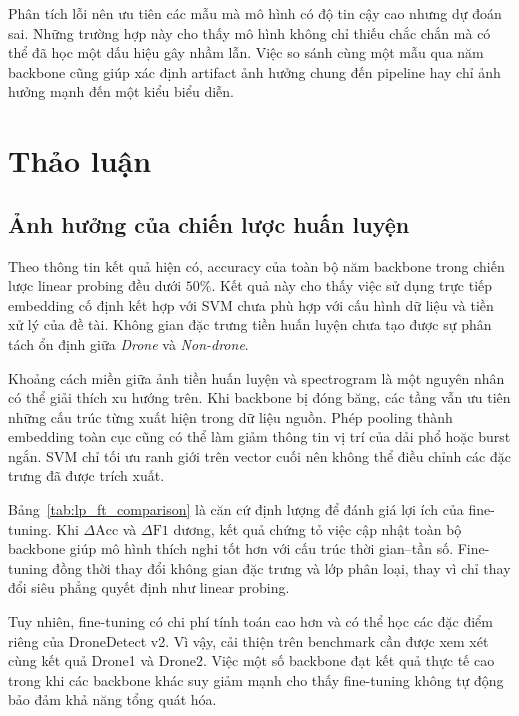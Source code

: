 \documentclass[../DoAn.tex]{subfiles}
\begin{document}

Phân tích lỗi nên ưu tiên các mẫu mà mô hình có độ tin cậy cao nhưng dự đoán sai. Những trường hợp này cho thấy mô hình không chỉ thiếu chắc chắn mà có thể đã học một dấu hiệu gây nhầm lẫn. Việc so sánh cùng một mẫu qua năm backbone cũng giúp xác định artifact ảnh hưởng chung đến pipeline hay chỉ ảnh hưởng mạnh đến một kiểu biểu diễn.

\section{Thảo luận}

\subsection{Ảnh hưởng của chiến lược huấn luyện}

Theo thông tin kết quả hiện có, accuracy của toàn bộ năm backbone trong chiến lược linear probing đều dưới $50\%$. Kết quả này cho thấy việc sử dụng trực tiếp embedding cố định kết hợp với SVM chưa phù hợp với cấu hình dữ liệu và tiền xử lý của đề tài. Không gian đặc trưng tiền huấn luyện chưa tạo được sự phân tách ổn định giữa \textit{Drone} và \textit{Non-drone}.

Khoảng cách miền giữa ảnh tiền huấn luyện và spectrogram là một nguyên nhân có thể giải thích xu hướng trên. Khi backbone bị đóng băng, các tầng vẫn ưu tiên những cấu trúc từng xuất hiện trong dữ liệu nguồn. Phép pooling thành embedding toàn cục cũng có thể làm giảm thông tin vị trí của dải phổ hoặc burst ngắn. SVM chỉ tối ưu ranh giới trên vector cuối nên không thể điều chỉnh các đặc trưng đã được trích xuất.

Bảng~\ref{tab:lp_ft_comparison} là căn cứ định lượng để đánh giá lợi ích của fine-tuning. Khi $\Delta \mathrm{Acc}$ và $\Delta \mathrm{F1}$ dương, kết quả chứng tỏ việc cập nhật toàn bộ backbone giúp mô hình thích nghi tốt hơn với cấu trúc thời gian--tần số. Fine-tuning đồng thời thay đổi không gian đặc trưng và lớp phân loại, thay vì chỉ thay đổi siêu phẳng quyết định như linear probing.

Tuy nhiên, fine-tuning có chi phí tính toán cao hơn và có thể học các đặc điểm riêng của DroneDetect v2. Vì vậy, cải thiện trên benchmark cần được xem xét cùng kết quả Drone1 và Drone2. Việc một số backbone đạt kết quả thực tế cao trong khi các backbone khác suy giảm mạnh cho thấy fine-tuning không tự động bảo đảm khả năng tổng quát hóa.
\end{document}
